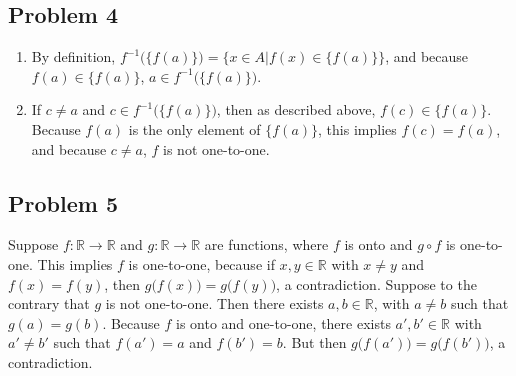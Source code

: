 \documentclass{article}
\begin{document}
\subsection*{Problem 4}
\begin{enumerate}[label=(\alph*)]
	\item By definition, \(f^{-1}\big(\{f(a)\}\big)=\big\{x\in A|f(x)\in\{f(a)\}\big\}\), and because \(f(a)\in\{f(a)\}\), \(a\in f^{-1}\big(\{f(a)\}\big)\).
	\item If \(c\neq a\) and \(c\in f^{-1}\big(\{f(a)\}\big)\), then as described above, \(f(c)\in\{f(a)\}\). Because \(f(a)\) is the only element of \(\{f(a)\}\), this implies \(f(c)=f(a)\), and because \(c\neq a\), \(f\) is not one-to-one.
\end{enumerate}
\subsection*{Problem 5}
Suppose \(f:\mathbb{R}\rightarrow\mathbb{R}\) and \(g:\mathbb{R}\rightarrow\mathbb{R}\) are functions, where \(f\) is onto and \(g\circ f\) is one-to-one. This implies \(f\) is one-to-one, because if \(x,y\in\mathbb{R}\) with \(x\neq y\) and \(f(x)=f(y)\), then \(g\big(f(x)\big)=g\big(f(y)\big)\), a contradiction. Suppose to the contrary that \(g\) is not one-to-one. Then there exists \(a,b\in\mathbb{R}\), with \(a\neq b\) such that \(g(a)=g(b)\). Because \(f\) is onto and one-to-one, there exists \(a',b'\in\mathbb{R}\) with \(a'\neq b'\) such that \(f(a')=a\) and \(f(b')=b\). But then \(g\big(f(a')\big)=g\big(f(b')\big)\), a contradiction.
\end{document}
